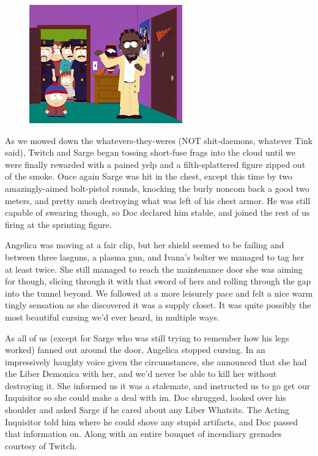 \begin{figure}
	\begin{center}
		\includegraphics[width=\figwidth]{pics/19/44.png}
	\end{center}
\end{figure}
As we mowed down the whatevers-they-weres (NOT shit-daemons, whatever Tink said), Twitch and Sarge began tossing short-fuse frags into the cloud until we were finally rewarded with a pained yelp and a filth-splattered figure zipped out of the smoke. 
Once again Sarge was hit in the chest, except this time by two amazingly-aimed bolt-pistol rounds, knocking the burly noncom back a good two meters, and pretty much destroying what was left of his chest armor. 
He was still capable of swearing though, so Doc declared him stable, and joined the rest of us firing at the sprinting figure.

Angelica was moving at a fair clip, but her shield seemed to be failing and between three lasguns, a plasma gun, and Ivana's bolter we managed to tag her at least twice. 
She still managed to reach the maintenance door she was aiming for though, slicing through it with that sword of hers and rolling through the gap into the tunnel beyond. 
We followed at a more leisurely pace and felt a nice warm tingly sensation as she discovered it was a supply closet. 
It was quite possibly the most beautiful cursing we'd ever heard, in multiple ways. 


As all of us (except for Sarge who was still trying to remember how his legs worked) fanned out around the door, Angelica stopped cursing. 
In an impressively haughty voice given the circumstances, she announced that she had the Liber Demonica with her, and we'd never be able to kill her without destroying it. 
She informed us it was a stalemate, and instructed us to go get our Inquisitor so she could make a deal with im. 
Doc shrugged, looked over his shoulder and asked Sarge if he cared about any Liber Whatsits. 
The Acting Inquisitor told him where he could shove any stupid artifacts, and Doc passed that information on. 
Along with an entire bouquet of incendiary grenades courtesy of Twitch.

